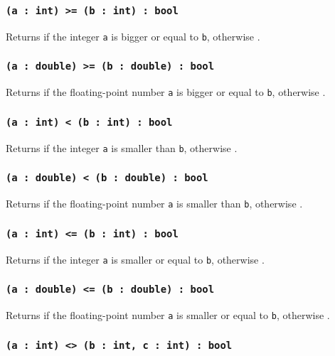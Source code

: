 \subsubsection{\texttt{(a : int) >= (b : int) : bool}}

Returns \true{} if the integer \texttt{a} is bigger or equal to \texttt{b}, otherwise \false{}.

\subsubsection{\texttt{(a : double) >= (b : double) : bool}}

Returns \true{} if the floating-point number \texttt{a} is bigger or equal to \texttt{b}, otherwise \false{}.

\subsubsection{\texttt{(a : int) < (b : int) : bool}}

Returns \true{} if the integer \texttt{a} is smaller than \texttt{b}, otherwise \false{}.

\subsubsection{\texttt{(a : double) < (b : double) : bool}}

Returns \true{} if the floating-point number \texttt{a} is smaller than \texttt{b}, otherwise \false{}.

\subsubsection{\texttt{(a : int) <= (b : int) : bool}}

Returns \true{} if the integer \texttt{a} is smaller or equal to \texttt{b}, otherwise \false{}.

\subsubsection{\texttt{(a : double) <= (b : double) : bool}}

Returns \true{} if the floating-point number \texttt{a} is smaller or equal to \texttt{b}, otherwise \false{}.

\subsubsection{\texttt{(a : int) <> (b : int, c : int) : bool}}

